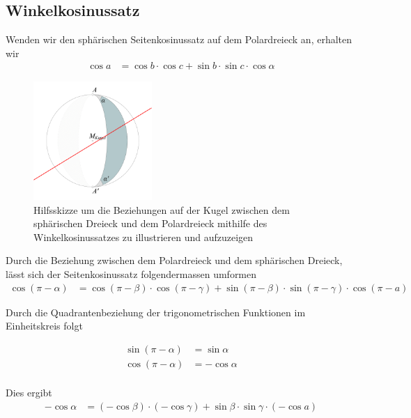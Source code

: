 \begin{refsection}
\subsection{Winkelkosinussatz}

Wenden wir den sphärischen Seitenkosinussatz auf dem Polardreieck an, erhalten wir
\begin{align*}
{\cos a} &= {\cos b} \cdot {\cos c} + {\sin b} \cdot {\sin c} \cdot {\cos \alpha}
\end{align*}

\begin{figure}[htbp]
\centering
\includegraphics[width=0.4\textwidth]{kugel/Zweieck.jpg}
\caption{Hilfsskizze um die Beziehungen auf der Kugel zwischen dem sphärischen Dreieck und dem Polardreieck mithilfe des Winkelkosinussatzes zu illustrieren und aufzuzeigen}
\end{figure}

Durch die Beziehung zwischen dem Polardreieck und dem sphärischen Dreieck, lässt sich der Seitenkosinussatz folgendermassen umformen
\begin{align*}
{\cos (\pi-\alpha)} &= {\cos (\pi-\beta)} \cdot {\cos (\pi-\gamma)} + {\sin(\pi-\beta)} \cdot {\sin(\pi-\gamma)} \cdot {\cos (\pi-a)}
\end{align*}

Durch die Quadrantenbeziehung der trigonometrischen Funktionen im Einheitskreis folgt

\begin{align*}
\sin (\pi-\alpha) &= \sin \alpha\\
\cos (\pi-\alpha) &= - \cos \alpha\\
\end{align*}

Dies ergibt
\begin{align*}
{-\cos \alpha} &= {(-\cos \beta)} \cdot {(-\cos \gamma)} + {\sin \beta} \cdot {\sin \gamma} \cdot {(-\cos a)}
\end{align*}


\end{refsection}
